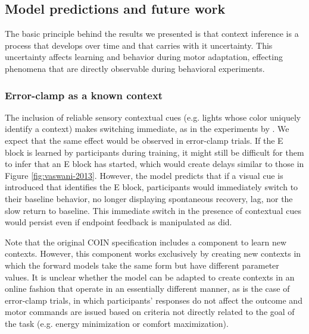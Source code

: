 \documentclass[a4paper,doc,floatsintext,natbib]{apa6}
\def \fref #1{Figure \ref{#1}}     %
\begin{document}
\subsection{Model predictions and future work}
The basic principle behind the results we presented is that context inference is a process that develops over time and that carries with it uncertainty. This uncertainty affects learning and behavior during motor adaptation, effecting phenomena that are directly observable during behavioral experiments.

\subsubsection{Error-clamp as a known context}
The inclusion of reliable sensory contextual cues (e.g. lights whose color uniquely identify a context) makes switching immediate, as in the experiments by \cite{Kim_Neural_2015}. We expect that the same effect would be observed in error-clamp trials. If the E block is learned by participants during training, it might still be difficult for them to infer that an E block has started, which would create delays similar to those in \fref{fig:vaswani-2013}. However, the model predicts that if a visual cue is introduced that identifies the E block, participants would immediately switch to their baseline behavior, no longer displaying spontaneous recovery, lag, nor the slow return to baseline. This immediate switch in the presence of contextual cues would persist even if endpoint feedback is manipulated as \cite{Vaswani_Decay_2013} did.

Note that the original COIN specification includes a component to learn new contexts. However, this component works exclusively by creating new contexts in which the forward models take the same form but have different parameter values. It is unclear whether the model can be adapted to create contexts in an online fashion that operate in an essentially different manner, as is the case of error-clamp trials, in which participants' responses do not affect the outcome and motor commands are issued based on criteria not directly related to the goal of the task (e.g. energy minimization or comfort maximization).
\end{document}
